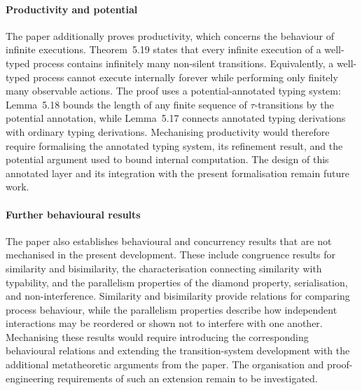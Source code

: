 \paragraph{Productivity and potential} The paper additionally proves productivity, which concerns the behaviour of infinite executions. Theorem~5.19 states that every infinite execution of a well-typed process contains infinitely many non-silent transitions. Equivalently, a well-typed process cannot execute internally forever while performing only finitely many observable actions. The proof uses a potential-annotated typing system: Lemma~5.18 bounds the length of any finite sequence of $\tau$-transitions by the potential annotation, while Lemma~5.17 connects annotated typing derivations with ordinary typing derivations. Mechanising productivity would therefore require formalising the annotated typing system, its refinement result, and the potential argument used to bound internal computation. The design of this annotated layer and its integration with the present formalisation remain future work.

\paragraph{Further behavioural results} The paper also establishes behavioural and concurrency results that are not mechanised in the present development. These include congruence results for similarity and bisimilarity, the characterisation connecting similarity with typability, and the parallelism properties of the diamond property, serialisation, and non-interference. Similarity and bisimilarity provide relations for comparing process behaviour, while the parallelism properties describe how independent interactions may be reordered or shown not to interfere with one another. Mechanising these results would require introducing the corresponding behavioural relations and extending the transition-system development with the additional metatheoretic arguments from the paper. The organisation and proof-engineering requirements of such an extension remain to be investigated.
